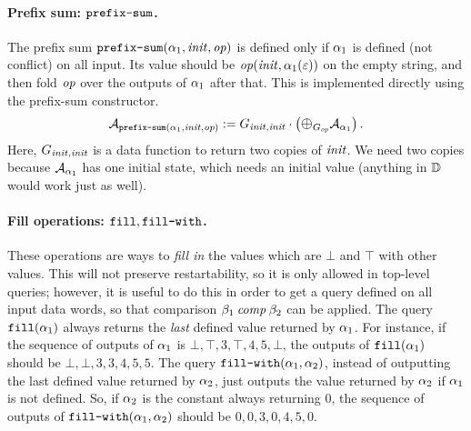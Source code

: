 \paragraph*{Prefix sum: $\texttt{prefix-sum}$.}
The prefix sum $\texttt{prefix-sum}(\alpha_1,\mathit{init},\mathit{op})$ is defined only if $\alpha_1$ is defined (not conflict) on all input. Its value should be $\mathit{op}(\mathit{init},\alpha_1(\varepsilon))$ on the empty string, and then fold $\mathit{op}$ over the outputs of $\alpha_1$ after that. This is implemented directly using the prefix-sum constructor.
\[
\DT_{\prefsumQ(\qq_1,\initval,\op)} :=
    \concat{G_{\initval,\initval}}{\left(\prefixsum{\DT_{\qq_1}}{\DF_\op}\right)}.
\]
Here, $G_{\mathit{init},\mathit{init}}$ is a data function to return two copies of $\mathit{init}$. We need two copies because $\mathcal{A}_{\alpha_1}$ has one initial state, which needs an initial value (anything in $\mathbb{D}$ would work just as well).

\paragraph*{Fill operations: $\texttt{fill}, \texttt{fill-with}$.}
These operations are ways to \emph{fill in} the values which are $\bot$ and $\top$ with other values. This will not preserve restartability, so it is only allowed in top-level queries; however, it is useful to do this in order to get a query defined on all input data words, so that comparison $\beta_1 \mathbin{\mathit{comp}} \beta_2$ can be applied.
The query $\texttt{fill}(\alpha_1)$ always returns the \emph{last} defined value returned by $\alpha_1$. For instance, if the sequence of outputs of $\alpha_1$ is $\bot, \top, 3, \top, 4, 5, \bot$, the outputs of $\texttt{fill}(\alpha_1)$ should be $\bot, \bot, 3, 3, 4, 5, 5$.
The query $\texttt{fill-with}(\alpha_1,\alpha_2)$, instead of outputting the last defined value returned by $\alpha_2$, just outputs the value returned by $\alpha_2$ if $\alpha_1$ is not defined. So, if $\alpha_2$ is the constant always returning $0$, the sequence of outputs of $\texttt{fill-with}(\alpha_1,\alpha_2)$ should be $0, 0, 3, 0, 4, 5, 0$.

